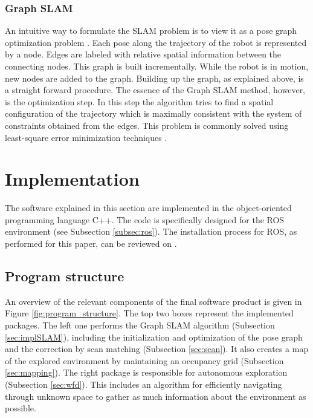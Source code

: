 \documentclass{ba-kecs}
\begin{document}
\subsubsection{Graph SLAM}
An intuitive way to formulate the SLAM problem is to view it as a pose graph optimization problem \citep{Grisetti}. Each pose along the trajectory of the robot is represented by a node. Edges are labeled with relative spatial information between the connecting nodes. This graph is built incrementally. While the robot is in motion, new nodes are added to the graph. Building up the graph, as explained above, is a straight forward procedure. The essence of the Graph SLAM method, however, is the optimization step. In this step the algorithm tries to find a spatial configuration of the trajectory which is maximally consistent with the system of constraints obtained from the edges. This problem is commonly solved using least-square error minimization techniques \citep{Leastsquares}.

\section{Implementation}
\label{sec:impl}

The software explained in this section are implemented in the object-oriented programming language C++. The code is specifically designed for the ROS environment (see Subsection \ref{subsec:ros}). The installation process for ROS, as performed for this paper, can be reviewed on \cite{swarmlab}.

\subsection{Program structure}
\label{sec:struct}
An overview of the relevant components of the final software product is given in Figure \ref{fig:program_structure}. The top two boxes represent the implemented packages. The left one performs the Graph SLAM algorithm (Subsection \ref{sec:implSLAM}), including the initialization and optimization of the pose graph and the correction by scan matching (Subsection \ref{sec:scan}). It also creates a map of the explored environment by maintaining an occupancy grid (Subsection \ref{sec:mapping}). The right package is responsible for autonomous exploration (Subsection \ref{sec:wfd}). This includes an algorithm for efficiently navigating through unknown space to gather as much information about the environment as possible.
\end{document}
